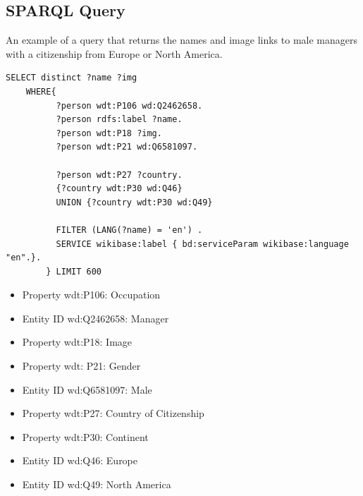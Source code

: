 \documentclass[12pt,english]{article}
\begin{document}
\begin{appendices}
\section{SPARQL Query}
\label{appen1}
An example of a query that returns the names and image links to male managers with a citizenship from Europe or North America.
 
\begin{verbatim}
SELECT distinct ?name ?img
    WHERE{
          ?person wdt:P106 wd:Q2462658.
          ?person rdfs:label ?name.
          ?person wdt:P18 ?img.
          ?person wdt:P21 wd:Q6581097.
          
          ?person wdt:P27 ?country.
          {?country wdt:P30 wd:Q46} 
          UNION {?country wdt:P30 wd:Q49}
          
          FILTER (LANG(?name) = 'en') .
          SERVICE wikibase:label { bd:serviceParam wikibase:language "en".}.
        } LIMIT 600
\end{verbatim}

\begin{itemize}
\item Property wdt:P106: Occupation
\item Entity ID wd:Q2462658: Manager
\item Property wdt:P18: Image
\item Property wdt: P21: Gender
\item Entity ID wd:Q6581097: Male
\item Property wdt:P27: Country of Citizenship
\item Property wdt:P30: Continent
\item Entity ID wd:Q46: Europe
\item Entity ID wd:Q49: North America
\end{itemize}


\end{appendices}

\nocite{*}

\printbibliography
\end{document}
